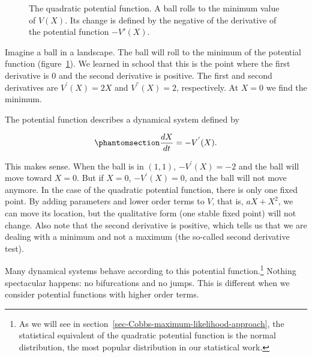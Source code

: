 \documentclass[
  a4paper,
  DIV=11,
  numbers=noendperiod,
  oneside]{scrreprt}
\begin{document}
\begin{figure}


\caption{\label{fig-ch3-img3-old-15}The quadratic potential function. A
ball rolls to the minimum value of \(V(X)\). Its change is defined by
the negative of the derivative of the potential function \(-V'(X)\).}

\end{figure}%

Imagine a ball in a landscape. The ball will roll to the minimum of the
potential function (figure~\ref{fig-ch3-img3-old-15}). We learned in
school that this is the point where the first derivative is 0 and the
second derivative is positive. The first and second derivatives are
\(V^{'}(X) = 2X\) and \(V^{''}(X) = 2\), respectively. At \(X = 0\) we
find the minimum.

The potential function describes a dynamical system defined by

\begin{equation}\phantomsection\label{eq-ch3-2-old-6}{
\frac{dX}{dt} = - V^{'}(X).
}\end{equation}

This makes sense. When the ball is in \((1,1)\), \(- V^{'}(X) = - 2\)
and the ball will move toward \(X = 0\). But if \(X = 0\),
\(- V^{'}(X) = 0\), and the ball will not move anymore. In the case of
the quadratic potential function, there is only one fixed point. By
adding parameters and lower order terms to \(V\), that is,
\({aX + X}^{2}\), we can move its location, but the qualitative form
(one stable fixed point) will not change. Also note that the second
derivative is positive, which tells us that we are dealing with a
minimum and not a maximum (the so-called second derivative test).

Many dynamical systems behave according to this potential
function.\footnote{As we will see in
  section~\ref{sec-Cobbs-maximum-likelihood-approach}, the statistical
  equivalent of the quadratic potential function is the normal
  distribution, the most popular distribution in our statistical work.}
Nothing spectacular happens: no bifurcations and no jumps. This is
different when we consider potential functions with higher order terms.
\end{document}
